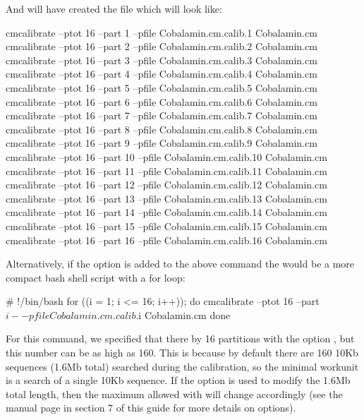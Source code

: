 And will have created the file  which will look
like:

\begin{sreoutput}
cmcalibrate --ptot 16 --part 1 --pfile Cobalamin.cm.calib.1 Cobalamin.cm
cmcalibrate --ptot 16 --part 2 --pfile Cobalamin.cm.calib.2 Cobalamin.cm
cmcalibrate --ptot 16 --part 3 --pfile Cobalamin.cm.calib.3 Cobalamin.cm
cmcalibrate --ptot 16 --part 4 --pfile Cobalamin.cm.calib.4 Cobalamin.cm
cmcalibrate --ptot 16 --part 5 --pfile Cobalamin.cm.calib.5 Cobalamin.cm
cmcalibrate --ptot 16 --part 6 --pfile Cobalamin.cm.calib.6 Cobalamin.cm
cmcalibrate --ptot 16 --part 7 --pfile Cobalamin.cm.calib.7 Cobalamin.cm
cmcalibrate --ptot 16 --part 8 --pfile Cobalamin.cm.calib.8 Cobalamin.cm
cmcalibrate --ptot 16 --part 9 --pfile Cobalamin.cm.calib.9 Cobalamin.cm
cmcalibrate --ptot 16 --part 10 --pfile Cobalamin.cm.calib.10 Cobalamin.cm
cmcalibrate --ptot 16 --part 11 --pfile Cobalamin.cm.calib.11 Cobalamin.cm
cmcalibrate --ptot 16 --part 12 --pfile Cobalamin.cm.calib.12 Cobalamin.cm
cmcalibrate --ptot 16 --part 13 --pfile Cobalamin.cm.calib.13 Cobalamin.cm
cmcalibrate --ptot 16 --part 14 --pfile Cobalamin.cm.calib.14 Cobalamin.cm
cmcalibrate --ptot 16 --part 15 --pfile Cobalamin.cm.calib.15 Cobalamin.cm
cmcalibrate --ptot 16 --part 16 --pfile Cobalamin.cm.calib.16 Cobalamin.cm
\end{sreoutput}

Alternatively, if the  option is added to the above
command the  would be a more compact bash
shell script with a for loop:

\begin{sreoutput}
# !/bin/bash
for ((i = 1; i <= 16; i++)); do
  cmcalibrate --ptot 16 --part $i --pfile Cobalamin.cm.calib.$i Cobalamin.cm
done
\end{sreoutput}

For this command, we specified that there by 16 partitions with the
option , but this number can be as high as
160. This is because by default there are 160 10Kb sequences (1.6Mb
total) searched during the calibration, so the minimal workunit is 
a search of a single 10Kb sequence. If the  option is used to
modify the 1.6Mb total length, then the maximum allowed 
with  will change accordingly (see the
 manual page in section 7 of this guide for more
details on  options).

